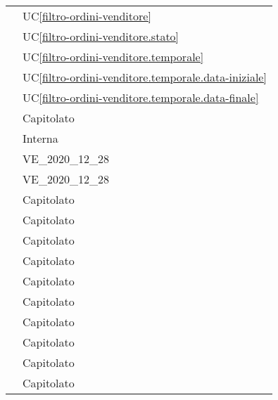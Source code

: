\begin{longtable}{C{6cm} C{6cm}}
     & UC\ref{filtro-ordini-venditore} \\
        
     & UC\ref{filtro-ordini-venditore.stato} \\
        
     & UC\ref{filtro-ordini-venditore.temporale} \\
        
     & UC\ref{filtro-ordini-venditore.temporale.data-iniziale} \\
        
     & UC\ref{filtro-ordini-venditore.temporale.data-finale} \\

     & Capitolato  \\

	 & Interna \\

	 & VE\_2020\_12\_28 \\

	 & VE\_2020\_12\_28 \\
	
     & Capitolato \\
	
     & Capitolato \\
    
     & Capitolato \\
    
     & Capitolato \\
    
     & Capitolato \\
    
     & Capitolato \\
    
     & Capitolato \\
    
     & Capitolato \\
    
     & Capitolato \\
    
     & Capitolato \\
    

\end{longtable}
